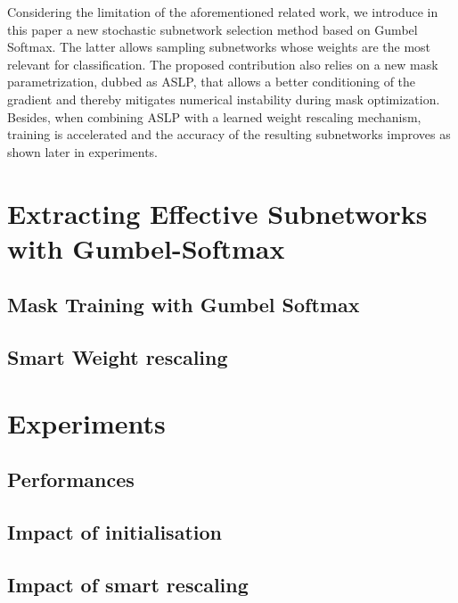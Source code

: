 Considering the limitation of the aforementioned related  work, we introduce in
this paper a new stochastic subnetwork selection method based on Gumbel Softmax.
The latter allows sampling subnetworks whose weights are the most relevant for
classification. The proposed contribution also relies on a new mask
parametrization, dubbed as \ac{ASLP}, that allows a better conditioning of the
gradient and thereby mitigates numerical instability during mask optimization.
Besides, when combining \ac{ASLP} with a learned weight rescaling mechanism,
training is accelerated and the accuracy of the resulting subnetworks improves
as shown later in experiments.


\section{Extracting Effective Subnetworks with Gumbel-Softmax}


\subsection{Mask Training with Gumbel Softmax}


\subsection{Smart Weight rescaling}


\section{Experiments}

\subsection{Performances}

\subsection{Impact of initialisation}

\subsection{Impact of smart rescaling}



